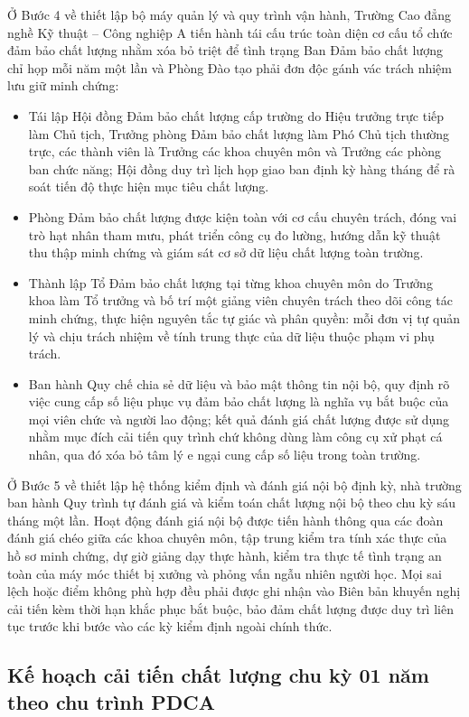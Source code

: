 Ở Bước 4 về thiết lập bộ máy quản lý và quy trình vận hành, Trường Cao đẳng nghề Kỹ thuật -- Công nghiệp A tiến hành tái cấu trúc toàn diện cơ cấu tổ chức đảm bảo chất lượng nhằm xóa bỏ triệt để tình trạng Ban Đảm bảo chất lượng chỉ họp mỗi năm một lần và Phòng Đào tạo phải đơn độc gánh vác trách nhiệm lưu giữ minh chứng:
\begin{itemize}
    \item Tái lập Hội đồng Đảm bảo chất lượng cấp trường do Hiệu trưởng trực tiếp làm Chủ tịch, Trưởng phòng Đảm bảo chất lượng làm Phó Chủ tịch thường trực, các thành viên là Trưởng các khoa chuyên môn và Trưởng các phòng ban chức năng; Hội đồng duy trì lịch họp giao ban định kỳ hàng tháng để rà soát tiến độ thực hiện mục tiêu chất lượng.
    \item Phòng Đảm bảo chất lượng được kiện toàn với cơ cấu chuyên trách, đóng vai trò hạt nhân tham mưu, phát triển công cụ đo lường, hướng dẫn kỹ thuật thu thập minh chứng và giám sát cơ sở dữ liệu chất lượng toàn trường.
    \item Thành lập Tổ Đảm bảo chất lượng tại từng khoa chuyên môn do Trưởng khoa làm Tổ trưởng và bố trí một giảng viên chuyên trách theo dõi công tác minh chứng, thực hiện nguyên tắc tự giác và phân quyền: mỗi đơn vị tự quản lý và chịu trách nhiệm về tính trung thực của dữ liệu thuộc phạm vi phụ trách.
    \item Ban hành Quy chế chia sẻ dữ liệu và bảo mật thông tin nội bộ, quy định rõ việc cung cấp số liệu phục vụ đảm bảo chất lượng là nghĩa vụ bắt buộc của mọi viên chức và người lao động; kết quả đánh giá chất lượng được sử dụng nhằm mục đích cải tiến quy trình chứ không dùng làm công cụ xử phạt cá nhân, qua đó xóa bỏ tâm lý e ngại cung cấp số liệu trong toàn trường.
\end{itemize}

Ở Bước 5 về thiết lập hệ thống kiểm định và đánh giá nội bộ định kỳ, nhà trường ban hành Quy trình tự đánh giá và kiểm toán chất lượng nội bộ theo chu kỳ sáu tháng một lần. Hoạt động đánh giá nội bộ được tiến hành thông qua các đoàn đánh giá chéo giữa các khoa chuyên môn, tập trung kiểm tra tính xác thực của hồ sơ minh chứng, dự giờ giảng dạy thực hành, kiểm tra thực tế tình trạng an toàn của máy móc thiết bị xưởng và phỏng vấn ngẫu nhiên người học. Mọi sai lệch hoặc điểm không phù hợp đều phải được ghi nhận vào Biên bản khuyến nghị cải tiến kèm thời hạn khắc phục bắt buộc, bảo đảm chất lượng được duy trì liên tục trước khi bước vào các kỳ kiểm định ngoài chính thức.

\subsection{Kế hoạch cải tiến chất lượng chu kỳ 01 năm theo chu trình PDCA}

